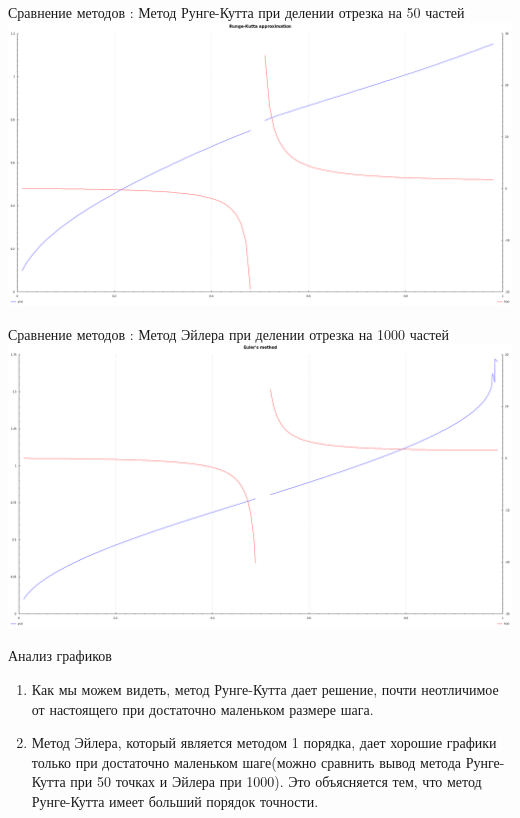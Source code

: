 \documentclass{beamer}
\begin{document}
\begin{frame}{Сравнение методов : Метод Рунге-Кутта при делении отрезка на 50 частей}
	\includegraphics[width=\textwidth]{runge50}
\end{frame}

\begin{frame}{Сравнение методов : Метод Эйлера при делении отрезка на 1000 частей}
    \includegraphics[width=\textwidth]{euler}
\end{frame}

\begin{frame}{Анализ графиков}
    \begin{enumerate}
        \item Как мы можем видеть, метод Рунге-Кутта дает решение, почти неотличимое от настоящего при достаточно маленьком размере шага.
        \item Метод Эйлера, который является методом 1 порядка, дает хорошие графики только при достаточно маленьком шаге(можно сравнить вывод метода Рунге-Кутта при 50 точках и Эйлера при 1000). Это объясняется тем, что метод Рунге-Кутта имеет больший порядок точности.
    \end{enumerate}
\end{frame}
\end{document}
